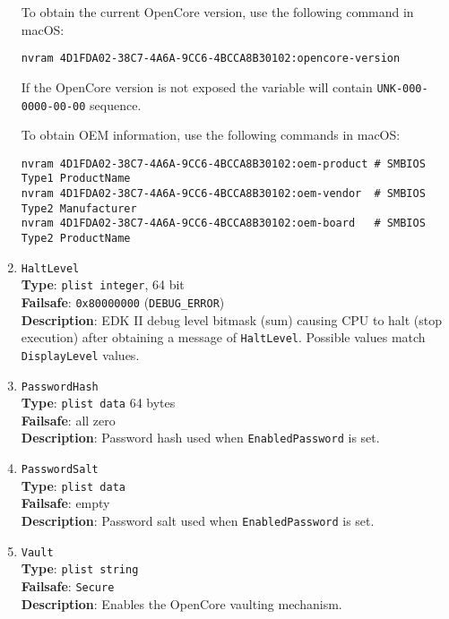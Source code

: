 \documentclass[]{article}
\begin{document}
\begin{enumerate}
  To obtain the current OpenCore version, use the following command in macOS:
\begin{lstlisting}[label=nvramver, style=ocbash]
nvram 4D1FDA02-38C7-4A6A-9CC6-4BCCA8B30102:opencore-version
\end{lstlisting}
  If the OpenCore version is not exposed the variable will contain
  \texttt{UNK-000-0000-00-00} sequence.

  To obtain OEM information, use the following commands in macOS:
\begin{lstlisting}[label=nvramoem, style=ocbash]
nvram 4D1FDA02-38C7-4A6A-9CC6-4BCCA8B30102:oem-product # SMBIOS Type1 ProductName
nvram 4D1FDA02-38C7-4A6A-9CC6-4BCCA8B30102:oem-vendor  # SMBIOS Type2 Manufacturer
nvram 4D1FDA02-38C7-4A6A-9CC6-4BCCA8B30102:oem-board   # SMBIOS Type2 ProductName
\end{lstlisting}

\item
  \texttt{HaltLevel}\\
  \textbf{Type}: \texttt{plist\ integer}, 64 bit\\
  \textbf{Failsafe}: \texttt{0x80000000} (\texttt{DEBUG\_ERROR})\\
  \textbf{Description}: EDK II debug level bitmask (sum) causing CPU to
  halt (stop execution) after obtaining a message of \texttt{HaltLevel}.
  Possible values match \texttt{DisplayLevel} values.

\item
  \texttt{PasswordHash}\\
  \textbf{Type}: \texttt{plist\ data} 64 bytes\\
  \textbf{Failsafe}: all zero\\
  \textbf{Description}: Password hash used when \texttt{EnabledPassword} is set.

\item
  \texttt{PasswordSalt}\\
  \textbf{Type}: \texttt{plist\ data}\\
  \textbf{Failsafe}: empty\\
  \textbf{Description}: Password salt used when \texttt{EnabledPassword} is set.

\item \label{securevaulting}
  \texttt{Vault}\\
  \textbf{Type}: \texttt{plist\ string}\\
  \textbf{Failsafe}: \texttt{Secure}\\
  \textbf{Description}: Enables the OpenCore vaulting mechanism.


\end{enumerate}
\end{document}
